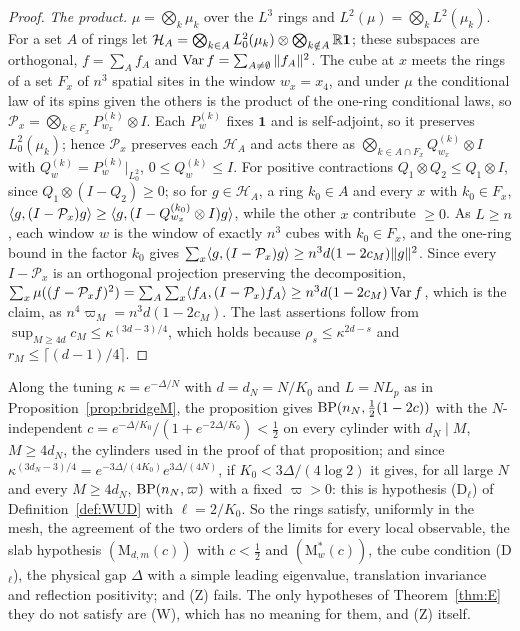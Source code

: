 \begin{proof}
\emph{The product.} $\mu=\bigotimes_k\mu_k$ over the $L^3$ rings and
$L^2(\mu)=\bigotimes_kL^2(\mu_k)$. For a set $A$ of rings let $\mathcal H_A=
\bigotimes_{k\in A}L^2_0(\mu_k)\otimes\bigotimes_{k\notin A}\mathbb{R}\mathbf1$; these
subspaces are orthogonal, $f=\sum_Af_A$ and $\operatorname{Var} f=\sum_{A\ne\emptyset}
\|f_A\|^2$. The cube at $x$ meets the rings of a set $F_x$ of $n^3$ spatial
sites in the window $w_x=x_4$, and under $\mu$ the conditional law of its
spins given the others is the product of the one-ring conditional laws, so
$\mathcal P_x=\bigotimes_{k\in F_x}P^{(k)}_{w_x}\otimes I$. Each $P^{(k)}_w$
fixes $\mathbf1$ and is self-adjoint, so it preserves $L^2_0(\mu_k)$; hence
$\mathcal P_x$ preserves each $\mathcal H_A$ and acts there as $\bigotimes_{k
\in A\cap F_x}Q^{(k)}_{w_x}\otimes I$ with $Q^{(k)}_w=P^{(k)}_w|_{L^2_0}$,
$0\le Q^{(k)}_w\le I$. For positive contractions $Q_1\otimes Q_2\le Q_1
\otimes I$, since $Q_1\otimes(I-Q_2)\ge0$; so for $g\in\mathcal H_A$, a ring
$k_0\in A$ and every $x$ with $k_0\in F_x$, $\langle g,(I-\mathcal P_x)g\rangle\ge\langle g,(I-Q^{(k_0)}_{w_x}\otimes I)g\rangle$, while the other $x$ contribute $\ge0$. As
$L\ge n$, each window $w$ is the window of exactly $n^3$ cubes with $k_0\in
F_x$, and the one-ring bound in the factor $k_0$ gives $\sum_x\langle g,(I-
\mathcal P_x)g\rangle\ge n^3d(1-2c_M)\|g\|^2$. Since every $I-\mathcal P_x$ is an
orthogonal projection preserving the decomposition,
$\sum_x\mu((f-\mathcal P_xf)^2)=\sum_A\sum_x\langle f_A,(I-\mathcal P_x)f_A\rangle\ge
n^3d(1-2c_M)\operatorname{Var} f$, which is the claim, as $n^4\varpi_M=n^3d(1-2c_M)$. The
last assertions follow from $\sup_{M\ge4d}c_M\le\kappa^{(3d-3)/4}$, which
holds because $\rho_s\le\kappa^{2d-s}$ and $r_M\le\lceil(d-1)/4\rceil$.
\end{proof}

Along the tuning $\kappa=e^{-\Delta/N}$ with $d=d_N=N/K_0$ and $L=NL_p$ as
in Proposition~\ref{prop:bridgeM}, the proposition gives $\mathrm{BP}(n_N,\frac12
(1-2c))$ with the $N$-independent $c=e^{-\Delta/K_0}/(1+e^{-2\Delta/K_0})<
\frac12$ on every cylinder with $d_N\mid M$, $M\ge4d_N$, the cylinders used
in the proof of that proposition; and since $\kappa^{(3d_N-3)/4}=e^{-3\Delta
/(4K_0)}e^{3\Delta/(4N)}$, if $K_0<3\Delta/(4\log2)$ it gives, for all large
$N$ and every $M\ge4d_N$, $\mathrm{BP}(n_N,\varpi)$ with a fixed $\varpi>0$: this is
hypothesis (D$_\ell$) of Definition~\ref{def:WUD} with $\ell=2/K_0$. So the
rings satisfy, uniformly in the mesh, the agreement of the two orders of the
limits for every local observable, the slab hypothesis $(\mathrm M_{d,m}(c))$
with $c<\frac12$ and $(\mathrm M^*_w(c))$, the cube condition (D$_\ell$), the
physical gap $\Delta$ with a simple leading eigenvalue, translation invariance
and reflection positivity; and (Z) fails. The only hypotheses of
Theorem~\ref{thm:E} they do not satisfy are (W), which has no meaning for
them, and (Z) itself.

